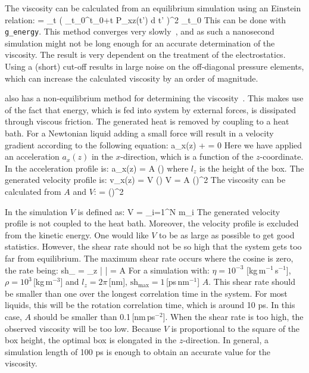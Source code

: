 The viscosity can be calculated from an equilibrium simulation using
an Einstein relation:
\beq
\eta =  \lim_{t \rightarrow \infty}
 \left\langle 
\left( \int_{t_0}^{{t_0}+t} P_{xz}(t') \mbox{d} t' \right)^2
\right\rangle_{t_0}
\eeq
This can be done with {\tt g_energy}.
This method converges very slowly~\cite{Hess2002a}, and as such
a nanosecond simulation might not
be long enough for an accurate determination of the viscosity.
The result is very dependent on the treatment of the electrostatics.
Using a (short) cut-off results in large noise on the off-diagonal
pressure elements, which can increase the calculated viscosity by an order
of magnitude.

{\gromacs} also has a non-equilibrium method for determining
the viscosity~\cite{Hess2002a}.
This makes use of the fact that energy, which is fed into system by
external forces, is dissipated through viscous friction. The generated heat
is removed by coupling to a heat bath. For a Newtonian liquid adding a 
small force will result in a velocity gradient according to the following
equation:
\beq
a_x(z) + \frac{\eta}{\rho}  = 0
\eeq
Here we have applied an acceleration $a_x(z)$ in the $x$-direction, which
is a function of the $z$-coordinate.
In {\gromacs} the acceleration profile is:
\beq
a_x(z) = A \cos\left(\right)
\eeq
where $l_z$ is the height of the box. The generated velocity profile is:
\beq
v_x(z) = V \cos\left(\right)
\eeq
\beq
V = A \frac{\rho}{\eta}\left(\right)^2
\eeq
The viscosity can be calculated from $A$ and $V$:
\beq
\label{visc}
\eta = \rho \left(\right)^2
\eeq

In the simulation $V$ is defined as:
\beq
V = 
         {\displaystyle \sum_{i=1}^N m_i}
\eeq
The generated velocity profile is not coupled to the heat bath. Moreover,
the velocity profile is excluded from the kinetic energy.
One would like $V$ to be as large as possible to get good statistics.
However, the shear rate should not be so high that the system gets too far
from equilibrium. The maximum shear rate occurs where the cosine is zero,
the rate being:
\beq
\mbox{sh}_{\max} =  \max_z \left|  \right|
= A \frac{\rho}{\eta} 
\eeq
For a simulation with: $\eta=10^{-3}$ [kg\,m$^{-1}$\,s$^{-1}$],
$\rho=10^3$\,[kg\,m$^{-3}$] and $l_z=2\pi$\,[nm],
$\mbox{sh}_{\max}=1$\,[ps\,nm$^{-1}$] $A$.
This shear rate should be smaller than one over the longest
correlation time in the system. For most liquids, this will be the rotation
correlation time, which is around 10 ps. In this case, $A$ should
be smaller than 0.1\,[nm\,ps$^{-2}$].
When the shear rate is too high, the observed viscosity will be too low.
Because $V$ is proportional to the square of the box height,
the optimal box is elongated in the $z$-direction.
In general, a simulation length of 100 ps is enough to obtain an
accurate value for the viscosity.

